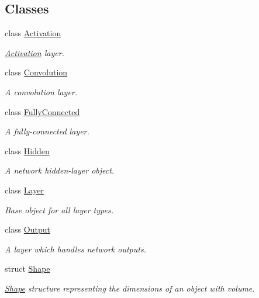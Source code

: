 \subsection*{Classes}
\begin{DoxyCompactItemize}
\item 
class \hyperlink{classffnn_1_1layer_1_1_activation}{Activation}
\begin{DoxyCompactList}\small\item\em \hyperlink{classffnn_1_1layer_1_1_activation}{Activation} layer. \end{DoxyCompactList}\item 
class \hyperlink{classffnn_1_1layer_1_1_convolution}{Convolution}
\begin{DoxyCompactList}\small\item\em A convolution layer. \end{DoxyCompactList}\item 
class \hyperlink{classffnn_1_1layer_1_1_fully_connected}{Fully\-Connected}
\begin{DoxyCompactList}\small\item\em A fully-\/connected layer. \end{DoxyCompactList}\item 
class \hyperlink{classffnn_1_1layer_1_1_hidden}{Hidden}
\begin{DoxyCompactList}\small\item\em A network hidden-\/layer object. \end{DoxyCompactList}\item 
class \hyperlink{classffnn_1_1layer_1_1_layer}{Layer}
\begin{DoxyCompactList}\small\item\em Base object for all layer types. \end{DoxyCompactList}\item 
class \hyperlink{classffnn_1_1layer_1_1_output}{Output}
\begin{DoxyCompactList}\small\item\em A layer which handles network outputs. \end{DoxyCompactList}\item 
struct \hyperlink{structffnn_1_1layer_1_1_shape}{Shape}
\begin{DoxyCompactList}\small\item\em \hyperlink{structffnn_1_1layer_1_1_shape}{Shape} structure representing the dimensions of an object with volume. \end{DoxyCompactList}\end{DoxyCompactItemize}
